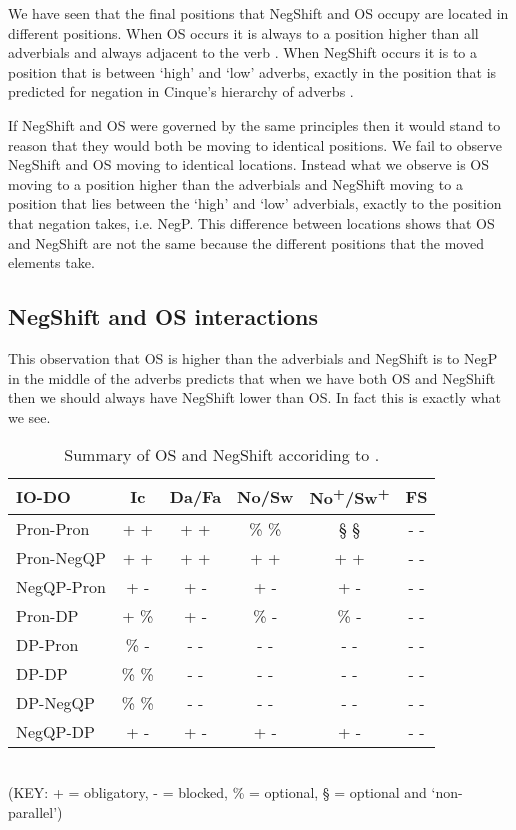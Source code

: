 \documentclass[12pt, letterpaper]{article}
\begin{document}
We have seen that the final positions that NegShift and OS occupy are located in different positions. When OS occurs it is always to a position higher than all adverbials and always adjacent to the verb \citep{holmbergWordOrderSyntactic1986,holmbergRemarksHolmbergGeneralization1999,erteschik-shirSoundPatternsSyntax2005}. When NegShift occurs it is to a position that is between `high' and `low' adverbs, exactly in the position that is predicted for negation in Cinque's hierarchy of adverbs \citep{nilsenAdverbsAshift1997,svenoniusStrainsNegationNorwegian2002}. 

If NegShift and OS were governed by the same principles then it would stand to reason that they would both be moving to identical positions. We fail to observe NegShift and OS moving to identical locations. Instead what we observe is OS moving to a position higher than the adverbials and NegShift moving to a position that lies between the `high' and `low' adverbials, exactly to the position that negation takes, i.e. NegP. This difference between locations shows that OS and NegShift are not the same because the different positions that the moved elements take.

\subsection{NegShift and OS interactions} \label{sec:INTERACTION}

This observation that OS is higher than the adverbials and NegShift is to NegP in the middle of the adverbs predicts that when we have both OS and NegShift then we should always have NegShift lower than OS. In fact this is exactly what we see.
\begin{table}[!ht]
\centering
\caption{Summary of OS and NegShift accoriding to \citet{christensenInterfacesNegationSyntax2005}.}
\label{tab:OSNEGS}
\begin{tabular}{lccccc}
\hline
IO-DO & Ic & Da/Fa & No/Sw & No\textsuperscript{+}/Sw\textsuperscript{+} & FS  \\
\hline 
Pron-Pron	&	+ +	&	+ +	&	\% \%	&	§ §	&	- -	\\
Pron-NegQP	&	+ +	&	+ +	&	+ +	&	+ +	&	- -	\\
NegQP-Pron	&	+ -	&	+ -	&	+ -	&	+ -	&	- -	\\
Pron-DP	&	+ \%	&	+ -	&	\% -	&	\% -	&	- -	\\
DP-Pron	&	\% -	&	- -	&	- -	&	- -	&	- -	\\
DP-DP	&	\% \%	&	- -	&	- -	&	- -	&	- -	\\
DP-NegQP	&	\% \%	&	- -	&	- -	&	- -	&	- -	\\
NegQP-DP	&	+ -	&	+ -	&	+ -	&	+ -	&	- -	\\
\hline 
\end{tabular}\\
(KEY: + = obligatory, - = blocked, \% = optional, § = optional and `non-parallel’)
\end{table}
\end{document}
